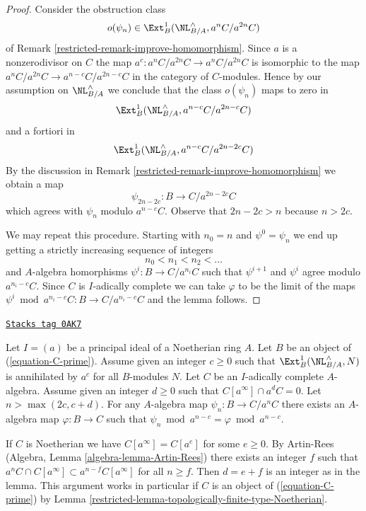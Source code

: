 \begin{proof}

Consider the obstruction class
$$
o(\psi_n) \in \Ext^1_B(\NL_{B/A}^\wedge, a^nC/a^{2n}C)
$$
of Remark \ref{restricted-remark-improve-homomorphism}. Since $a$ is a nonzerodivisor
on $C$ the map $a^c : a^nC/a^{2n}C \to a^nC/a^{2n}C$ is isomorphic to the
map $a^nC/a^{2n}C \to a^{n - c}C/a^{2n - c}C$ in the category of $C$-modules.
Hence by our assumption on $\NL_{B/A}^\wedge$
we conclude that the class $o(\psi_n)$ maps to zero in
$$
\Ext^1_B(\NL_{B/A}^\wedge, a^{n - c}C/a^{2n - c}C)
$$
and a fortiori in
$$
\Ext^1_B(\NL_{B/A}^\wedge, a^{n - c}C/a^{2n - 2c}C)
$$
By the discussion in Remark \ref{restricted-remark-improve-homomorphism} we obtain a map
$$
\psi_{2n - 2c} : B \to C/a^{2n - 2c}C
$$
which agrees with $\psi_n$ modulo $a^{n - c}C$.
Observe that $2n - 2c > n$ because $n > 2c$.

\medskip\noindent
We may repeat this procedure. Starting with $n_0 = n$ and
$\psi^0 = \psi_n$ we end up getting a strictly increasing
sequence of integers
$$
n_0 < n_1 < n_2 < \ldots
$$
and $A$-algebra homorphisms $\psi^i : B \to C/a^{n_i}C$
such that $\psi^{i + 1}$ and $\psi^i$ agree modulo $a^{n_i - c}C$.
Since $C$ is $I$-adically complete we can take $\varphi$
to be the limit of the maps
$\psi^i \bmod a^{n_i - c}C : B \to C/a^{n_i - c}C$
and the lemma follows.
\end{proof}

\begin{lemma}
\label{restricted-lemma-get-morphism-principal}
\href{https://stacks.math.columbia.edu/tag/0AK7}{\texttt{Stacks tag 0AK7}}

Let $I = (a)$ be a principal ideal of a Noetherian ring $A$.
Let $B$ be an object of (\ref{equation-C-prime}).
Assume given an integer $c \geq 0$ such that $\Ext^1_B(\NL_{B/A}^\wedge, N)$
is annihilated by $a^c$ for all $B$-modules $N$.
Let $C$ be an $I$-adically complete $A$-algebra.
Assume given an integer $d \geq 0$ such that $C[a^\infty] \cap a^dC = 0$.
Let $n > \max(2c, c + d)$. For any $A$-algebra map
$\psi_n : B \to C/a^nC$ there exists an $A$-algebra map
$\varphi : B \to C$ such
that $\psi_n \bmod a^{n - c} = \varphi \bmod a^{n - c}$.
\end{lemma}

If $C$ is Noetherian we have $C[a^\infty] = C[a^e]$ for some
$e \geq 0$. By Artin-Rees (Algebra, Lemma \ref{algebra-lemma-Artin-Rees})
there exists an integer $f$ such that
$a^nC \cap C[a^\infty] \subset a^{n - f}C[a^\infty]$ for all $n \geq f$.
Then $d = e + f$ is an integer as in the lemma. This argument
works in particular if $C$ is an object of (\ref{equation-C-prime})
by Lemma \ref{restricted-lemma-topologically-finite-type-Noetherian}.

